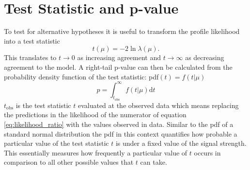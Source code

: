\section{Test Statistic and p-value}
To test for alternative hypotheses it is useful to transform the profile likelihood into a test statistic
\begin{equation}
    t(\mu)=-2\ln \lambda(\mu).
\end{equation}
This translates to $t \rightarrow 0$ as increasing agreement and $t \rightarrow \infty$ as decreasing agreement to the model. A right-tail p-value can then be calculated from the probability density function of the test statistic: \ac{pdf}$(t) = f(t | \mu)$
\begin{equation}\label{eq:p-value}
    p= \int_{t_\text{obs}}^{\infty}
    f(t | \mu) \mathrm{d}t
\end{equation}
$t_\text{obs}$ is the test statistic $t$ evaluated at the observed data which means replacing the predictions in the likelihood of the numerator of equation \ref{eq:likelihood_ratio} with the values observed in data. Similar to the \ac{pdf} of a standard normal distribution the \ac{pdf} in this context quantifies how probable a particular value of the test statistic $t$ is under a fixed value of the signal strength. This essentially measures how frequently a particular value of $t$ occurs in comparison to all other possible values that $t$ can take.

